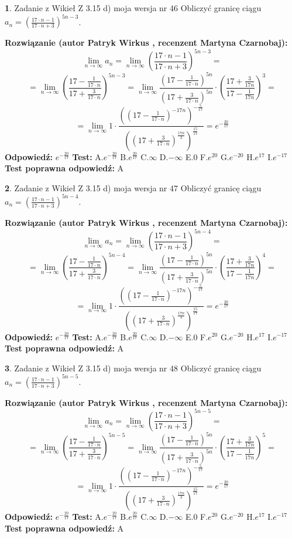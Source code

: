 \documentclass[12pt, a4paper]{article}
\theoremstyle{definition} %
\newtheorem{zad}{}
\newcommand{\zadStart}[1]{\begin{zad}#1\newline}
\newcommand{\zadStop}{\end{zad}}
\newcommand{\rozwStart}[2]{\noindent \textbf{Rozwiązanie (autor #1 , recenzent #2): }\newline}
\newcommand{\rozwStop}{\newline}
\newcommand{\odpStart}{\noindent \textbf{Odpowiedź:}\newline}
\newcommand{\odpStop}{\newline}
\newcommand{\testStart}{\noindent \textbf{Test:}\newline}
\newcommand{\testStop}{\newline}
\newcommand{\kluczStart}{\noindent \textbf{Test poprawna odpowiedź:}\newline}
\newcommand{\kluczStop}{\newline}
\begin{document}
\zadStart{Zadanie z Wikieł Z 3.15 d) moja wersja nr 46}
Obliczyć granicę ciągu $a_{n}=(\frac{17\cdot n - 1}{17 \cdot n + 3})^{5n-3}$.
\zadStop
\rozwStart{Patryk Wirkus}{Martyna Czarnobaj}
$$\lim\limits_{n\to\infty} a_{n} = \lim\limits_{n\to\infty}(\frac{17\cdot n - 1}{17 \cdot n + 3})^{5n-3}=$$
$$=\lim\limits_{n\to\infty}(\frac{17 - \frac{1}{17\cdot n}}{17 + \frac{3}{17 \cdot n}})^{5n-3}=\lim\limits_{n\to\infty}\frac{(17 - \frac{1}{17\cdot n})^{5n}}{(17 + \frac{3}{17\cdot n})^{5n}} \cdot (\frac{17+\frac{3}{17n}}{17-\frac{1}{17n}})^{3}=$$
$$=\lim\limits_{n\to\infty} 1 \cdot \frac{((17-\frac{1}{17 \cdot n})^{-17n})^{-\frac{5}{17}}}{((17+\frac{3}{17 \cdot n})^{\frac{17n}{3}})^{\frac{15}{17}}} =e^{-\frac{20}{17}}$$
\rozwStop
\odpStart
$e^{-\frac{20}{17}}$
\odpStop
\testStart
A.$ e^{-\frac{20}{17}}$
B.$ e^{\frac{20}{17}}$
C.$\infty$
D.$-\infty$
E.$0$
F.$e^{20}$
G.$e^{-20}$
H.$e^{17}$
I.$e^{-17}$
\testStop
\kluczStart
A
\kluczStop



\zadStart{Zadanie z Wikieł Z 3.15 d) moja wersja nr 47}
Obliczyć granicę ciągu $a_{n}=(\frac{17\cdot n - 1}{17 \cdot n + 3})^{5n-4}$.
\zadStop
\rozwStart{Patryk Wirkus}{Martyna Czarnobaj}
$$\lim\limits_{n\to\infty} a_{n} = \lim\limits_{n\to\infty}(\frac{17\cdot n - 1}{17 \cdot n + 3})^{5n-4}=$$
$$=\lim\limits_{n\to\infty}(\frac{17 - \frac{1}{17\cdot n}}{17 + \frac{3}{17 \cdot n}})^{5n-4}=\lim\limits_{n\to\infty}\frac{(17 - \frac{1}{17\cdot n})^{5n}}{(17 + \frac{3}{17\cdot n})^{5n}} \cdot (\frac{17+\frac{3}{17n}}{17-\frac{1}{17n}})^{4}=$$
$$=\lim\limits_{n\to\infty} 1 \cdot \frac{((17-\frac{1}{17 \cdot n})^{-17n})^{-\frac{5}{17}}}{((17+\frac{3}{17 \cdot n})^{\frac{17n}{3}})^{\frac{15}{17}}} =e^{-\frac{20}{17}}$$
\rozwStop
\odpStart
$e^{-\frac{20}{17}}$
\odpStop
\testStart
A.$ e^{-\frac{20}{17}}$
B.$ e^{\frac{20}{17}}$
C.$\infty$
D.$-\infty$
E.$0$
F.$e^{20}$
G.$e^{-20}$
H.$e^{17}$
I.$e^{-17}$
\testStop
\kluczStart
A
\kluczStop



\zadStart{Zadanie z Wikieł Z 3.15 d) moja wersja nr 48}
Obliczyć granicę ciągu $a_{n}=(\frac{17\cdot n - 1}{17 \cdot n + 3})^{5n-5}$.
\zadStop
\rozwStart{Patryk Wirkus}{Martyna Czarnobaj}
$$\lim\limits_{n\to\infty} a_{n} = \lim\limits_{n\to\infty}(\frac{17\cdot n - 1}{17 \cdot n + 3})^{5n-5}=$$
$$=\lim\limits_{n\to\infty}(\frac{17 - \frac{1}{17\cdot n}}{17 + \frac{3}{17 \cdot n}})^{5n-5}=\lim\limits_{n\to\infty}\frac{(17 - \frac{1}{17\cdot n})^{5n}}{(17 + \frac{3}{17\cdot n})^{5n}} \cdot (\frac{17+\frac{3}{17n}}{17-\frac{1}{17n}})^{5}=$$
$$=\lim\limits_{n\to\infty} 1 \cdot \frac{((17-\frac{1}{17 \cdot n})^{-17n})^{-\frac{5}{17}}}{((17+\frac{3}{17 \cdot n})^{\frac{17n}{3}})^{\frac{15}{17}}} =e^{-\frac{20}{17}}$$
\rozwStop
\odpStart
$e^{-\frac{20}{17}}$
\odpStop
\testStart
A.$ e^{-\frac{20}{17}}$
B.$ e^{\frac{20}{17}}$
C.$\infty$
D.$-\infty$
E.$0$
F.$e^{20}$
G.$e^{-20}$
H.$e^{17}$
I.$e^{-17}$
\testStop
\kluczStart
A
\kluczStop
\end{document}
